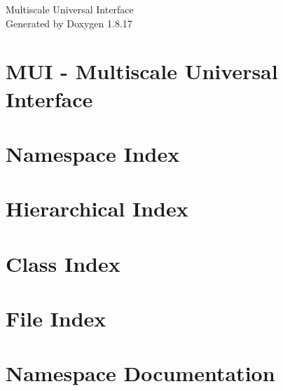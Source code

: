 \let\mypdfximage\pdfximage\def\pdfximage{\immediate\mypdfximage}\documentclass[twoside]{book}
\newcommand{\+}{\discretionary{\mbox{\scriptsize$\hookleftarrow$}}{}{}}
\newcommand{\clearemptydoublepage}{%
  \newpage{\pagestyle{empty}\cleardoublepage}%
}
\begin{document}
\hypersetup{pageanchor=false,
             bookmarksnumbered=true,
             pdfencoding=unicode
            }
\begin{titlepage}
\vspace*{7cm}
\begin{center}%
{\Large Multiscale Universal Interface }\\
\vspace*{1cm}
{\large Generated by Doxygen 1.8.17}\\
\end{center}
\end{titlepage}
\clearemptydoublepage
{}
\tableofcontents
\clearemptydoublepage
{}
\hypersetup{pageanchor=true}

\chapter{M\+UI -\/ Multiscale Universal Interface}
\label{md__home_stephen_eclipse-workspace__m_u_i-_forked__r_e_a_d_m_e}

\chapter{Namespace Index}

\chapter{Hierarchical Index}

\chapter{Class Index}

\chapter{File Index}

\chapter{Namespace Documentation}











\end{document}
